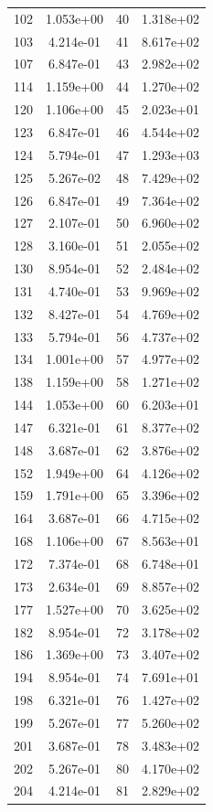 \documentclass[12pt]{article}
\begin{document}
\begin{longtable}{@{}cccc@{}}
102 & 1.053e+00 & 40 & 1.318e+02 \\
103 & 4.214e-01 & 41 & 8.617e+02 \\
107 & 6.847e-01 & 43 & 2.982e+02 \\
114 & 1.159e+00 & 44 & 1.270e+02 \\
120 & 1.106e+00 & 45 & 2.023e+01 \\
123 & 6.847e-01 & 46 & 4.544e+02 \\
124 & 5.794e-01 & 47 & 1.293e+03 \\
125 & 5.267e-02 & 48 & 7.429e+02 \\
126 & 6.847e-01 & 49 & 7.364e+02 \\
127 & 2.107e-01 & 50 & 6.960e+02 \\
128 & 3.160e-01 & 51 & 2.055e+02 \\
130 & 8.954e-01 & 52 & 2.484e+02 \\
131 & 4.740e-01 & 53 & 9.969e+02 \\
132 & 8.427e-01 & 54 & 4.769e+02 \\
133 & 5.794e-01 & 56 & 4.737e+02 \\
134 & 1.001e+00 & 57 & 4.977e+02 \\
138 & 1.159e+00 & 58 & 1.271e+02 \\
144 & 1.053e+00 & 60 & 6.203e+01 \\
147 & 6.321e-01 & 61 & 8.377e+02 \\
148 & 3.687e-01 & 62 & 3.876e+02 \\
152 & 1.949e+00 & 64 & 4.126e+02 \\
159 & 1.791e+00 & 65 & 3.396e+02 \\
164 & 3.687e-01 & 66 & 4.715e+02 \\
168 & 1.106e+00 & 67 & 8.563e+01 \\
172 & 7.374e-01 & 68 & 6.748e+01 \\
173 & 2.634e-01 & 69 & 8.857e+02 \\
177 & 1.527e+00 & 70 & 3.625e+02 \\
182 & 8.954e-01 & 72 & 3.178e+02 \\
186 & 1.369e+00 & 73 & 3.407e+02 \\
194 & 8.954e-01 & 74 & 7.691e+01 \\
198 & 6.321e-01 & 76 & 1.427e+02 \\
199 & 5.267e-01 & 77 & 5.260e+02 \\
201 & 3.687e-01 & 78 & 3.483e+02 \\
202 & 5.267e-01 & 80 & 4.170e+02 \\
204 & 4.214e-01 & 81 & 2.829e+02 \\

\end{longtable}
\end{document}
